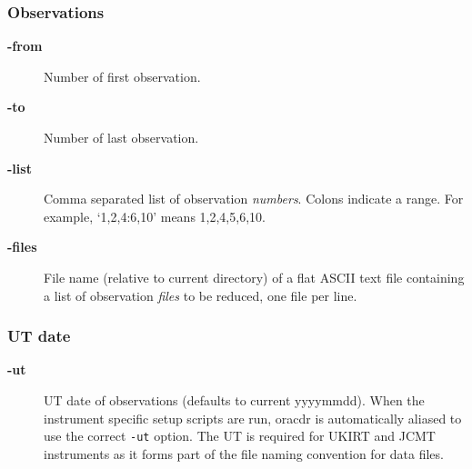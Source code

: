 \documentclass[twoside,11pt]{article}
\renewcommand{\_}{\texttt{\symbol{95}}}
\begin{document}
\subsubsection*{Observations\label{oracdr_Observations}}
\begin{description}

\item[{\textbf{-from}}] \mbox{}

Number of first observation.


\item[{\textbf{-to}}] \mbox{}

Number of last observation.


\item[{\textbf{-list}}] \mbox{}

Comma separated list of observation \textit{numbers}. Colons indicate a range.
For example, `1,2,4:6,10' means 1,2,4,5,6,10.


\item[{\textbf{-files}}] \mbox{}

File name (relative to current directory) of a flat ASCII text file containing
a list of observation \textit{files} to be reduced, one file per line.

\end{description}
\subsubsection*{UT date\label{oracdr_UT_date}}
\begin{description}

\item[{\textbf{-ut}}] \mbox{}

UT date of observations (defaults to current yyyymmdd). When the
instrument specific setup scripts are run, oracdr is automatically
aliased to use the correct \texttt{-ut} option. The UT is required for
UKIRT and JCMT instruments as it forms part of the file naming
convention for data files.

\end{description}
\end{document}
